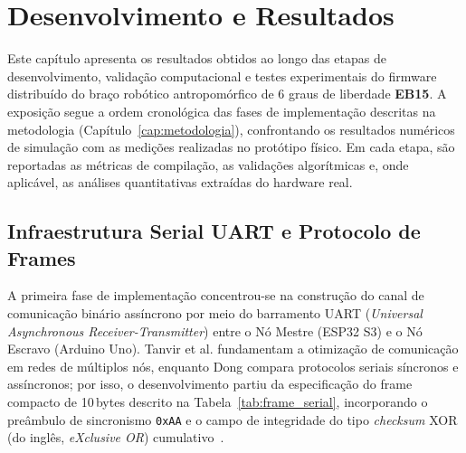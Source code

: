 
\chapter{Desenvolvimento e Resultados}
\label{cap:desenvolvimento}

Este capítulo apresenta os resultados obtidos ao longo das etapas de desenvolvimento, validação computacional e testes experimentais do firmware distribuído do braço robótico antropomórfico de 6 graus de liberdade \textbf{EB15}. A exposição segue a ordem cronológica das fases de implementação descritas na metodologia (Capítulo~\ref{cap:metodologia}), confrontando os resultados numéricos de simulação com as medições realizadas no protótipo físico. Em cada etapa, são reportadas as métricas de compilação, as validações algorítmicas e, onde aplicável, as análises quantitativas extraídas do hardware real.

\section{Infraestrutura Serial UART e Protocolo de Frames}
\label{sec:dev_uart}

A primeira fase de implementação concentrou-se na construção do canal de comunicação binário assíncrono por meio do barramento UART (\textit{Universal Asynchronous Receiver-Transmitter}) entre o Nó Mestre (ESP32 S3) e o Nó Escravo (Arduino Uno). Tanvir et al. fundamentam a otimização de comunicação em redes de múltiplos nós, enquanto Dong compara protocolos seriais síncronos e assíncronos; por isso, o desenvolvimento partiu da especificação do frame compacto de 10\,bytes descrito na Tabela~\ref{tab:frame_serial}, incorporando o preâmbulo de sincronismo \texttt{0xAA} e o campo de integridade do tipo \textit{checksum} XOR (do inglês, \textit{eXclusive OR}) cumulativo~\cite{tanvir2024optimizing, dong2022comparative}.

